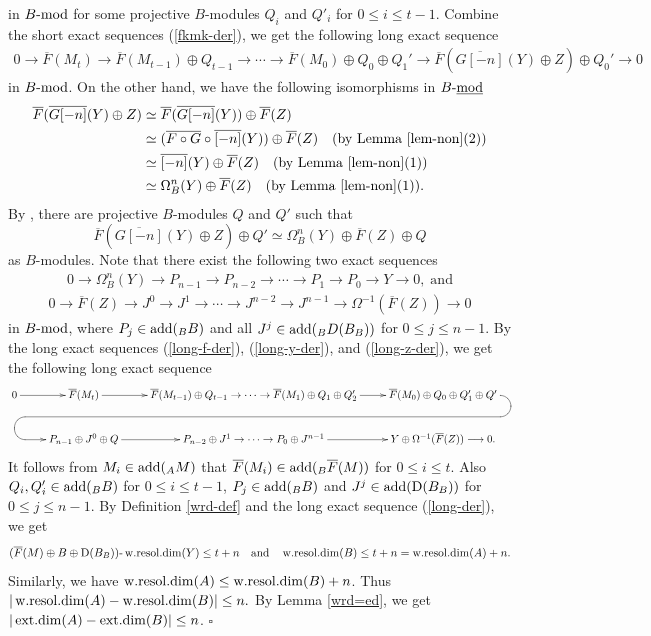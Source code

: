 \documentclass[12pt]{article}
\numberwithin{equation}{section}
\theoremstyle{definition}
\newcommand{\add}{{\rm add}}
\def\ed{\mathop{\rm ext.dim}\nolimits}
\def\wrd{\mathop{\rm w.resol.dim}\nolimits}
\newcommand{\DD}{{\rm D}}
\newcommand{\modcat}{\ensuremath{\mbox{{\rm -mod}}}}
\newcommand{\stmodcat}[1]{#1\mbox{{\rm -{\underline{mod}}}}}
\newcommand{\lra}{\longrightarrow}
\newcommand{\ra}{\rightarrow}
\begin{document}
in $B\modcat$ for some projective $B$-modules $Q_i$ and $Q'_i$ for $0\le i\le t-1$. Combine the short exact sequences (\ref{fkmk-der}), we get the following long exact sequence
\begin{align}\label{long-f-der}
0 \lra \overline{F}(M_{t})\lra \overline{F}(M_{t-1})\oplus Q_{t-1}\lra \cdots\lra
\overline{F}(M_{0})\oplus Q_{0}\oplus Q_{1}'\lra \overline{F}(\overline{G[-n]}(Y)\oplus Z)\oplus Q_{0}'\lra 0
\end{align}
in $B\modcat$. On the other hand, we have the following isomorphisms in $\stmodcat{B}$
\begin{align*}
\overline{F}(\overline{G[-n]}(Y)\oplus Z)
&\simeq \overline{F}(\overline{G[-n]}(Y))\oplus \overline{F}(Z)\\
&\simeq (\overline{F \circ G}\circ \overline{[-n]}(Y))\oplus \overline{F}(Z)
\quad \mbox{(by Lemma \ref{lem-non}(2))}\\
&\simeq  \overline{[-n]}(Y)\oplus \overline{F}(Z)
\quad \mbox{(by Lemma \ref{lem-non}(1))}\\
&\simeq  \Omega^{n}_{B}(Y)\oplus \overline{F}(Z)
\quad \mbox{(by Lemma \ref{lem-non}(1))}.
\end{align*}
By \cite[Theorem 2.2]{Heller60}, there are projective $B$-modules $Q$ and $Q'$ such that $$\overline{F}(\overline{G[-n]}(Y)\oplus Z)\oplus Q'\simeq \Omega^{n}_{B}(Y)\oplus \overline{F}(Z)\oplus Q$$ as $B$-modules. Note that there exist the following two exact sequences
\begin{align}\label{long-y-der} 0 \lra\Omega^{n}_{B}(Y) \lra P_{n-1 }\lra P_{n-2}
\lra\cdots \lra P_{1} \lra P_{0} \lra Y \lra 0,\;\mbox{and}
\end{align}
\begin{align}\label{long-z-der}
0 \lra \overline{F}(Z) \lra J^0\lra J^1
\lra\cdots \lra J^{n-2} \lra J^{n-1} \lra \Omega^{-1}(\overline{F}(Z))\lra 0
\end{align}
in $B\modcat$, where $P_{j}\in \add(_BB)$ and all $J^{j}\in \add(_BD(B_B))$ for $0\le j\le n-1$. By the long exact sequences (\ref{long-f-der}), (\ref{long-y-der}), and (\ref{long-z-der}), we get the following long exact sequence
\begin{align}\label{long-der}\xymatrix{
0\ar[r]& \overline{F}(M_{t})\ar[r]
& \overline{F}(M_{t-1})\oplus Q_{t-1}\ra
 \cdots\ra
 \overline{F}(M_{1})\oplus Q_{1}\oplus Q_{2}' \ar[r]
& \overline{F}(M_{0})\oplus Q_{0}\oplus Q_{1}'\oplus Q'
\ar `r[d] `[l] `[llld] `[dll] [dll]\\
& P_{ n-1 }\oplus J^0\oplus Q \ar[r]
& P_{n-2}\oplus J^1 \ra
\cdots\ra
P_{0}\oplus J^{n-1}\ar[r]
& Y\oplus \Omega^{-1}(\overline{F}(Z))\lra 0.
}\end{align}
It follows from $M_i\in \add(_AM)$ that $\overline{F}(M_i)\in \add(_B\overline{F}(M))$ for $0\le i\le t$. Also $Q_{i},Q_{i}'\in\add(_BB)$ for $0 \le i \le t-1$, $P_j\in \add(_BB)$ and $J^j\in \add(\DD(B_B))$ for $0\le j\le n-1$. By Definition \ref{wrd-def} and the long exact sequence (\ref{long-der}), we get
$$(\overline{F}(M)\oplus B\oplus \DD(B_B))\mbox{-}\wrd(Y)\le t+n
\quad\mbox{and}\quad
\wrd(B)\le t+n=\wrd(A)+n.$$ Similarly, we have $\wrd(A)\le \wrd(B)+n$. Thus $|\wrd(A)-\wrd(B)|\le n.$ By Lemma \ref{wrd=ed}, we get $|\ed(A)-\ed(B)|\le n$.
$\square$
\end{document}
